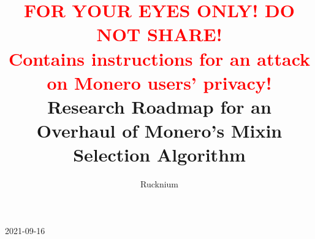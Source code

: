 \documentclass[english]{paper}
\begin{document}
\chead{\textbf{\textcolor{red}{FOR YOUR EYES ONLY! DO NOT SHARE!}}\\
\textbf{\textcolor{red}{Contains instructions for an attack on Monero
users' privacy!}}\\
}
\title{\textcolor{red}{\Large{}FOR YOUR EYES ONLY! DO NOT SHARE!}\\
\textcolor{red}{\Large{}Contains instructions for an attack on Monero
users' privacy!}\\
Research Roadmap for an Overhaul of Monero's Mixin Selection Algorithm}
\author{Rucknium}

\maketitle

2021-09-16
\end{document}
